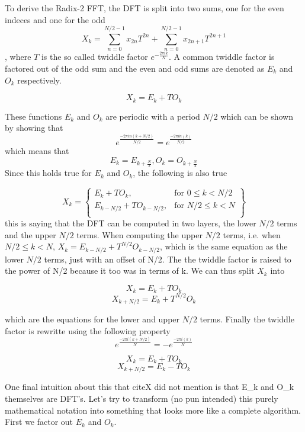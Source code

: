 To derive the Radix-2 FFT, the DFT is split into two sums, one for the even indeces and one for the odd $$X_k = \sum^{N/2-1}_{n=0} x_{2n}T^{2n}+ \sum^{N/2-1}_{n=0} x_{2n+1}T^{2n+1}$$, where $T$ is the so called twiddle factor $e^{-\frac{2\pi ik}{N}}$. A common twiddle factor is factored out of the odd sum and the even and odd sums are denoted as $E_k$ and $O_k$ respectively. 

$$X_k = E_k + TO_k$$

These functions $E_k$ and $O_k$ are periodic with a period $N/2$ which can be shown by showing that $$e^{\frac{-2\pi in(k+N/2)}{N/2}} = e^{\frac{-2\pi in(k)}{N/2}}$$
which means that 
$$E_k = E_{k+\frac{N}{2}}, O_k = O_{k+\frac{N}{2}}$$
Since this holds true for $E_k$ and $O_k$, the following is also true

\[
X_k = \left\{\begin{array}{lr}
    E_k + TO_k, & \text{for } 0 \leq k < N/2\\
    E_{k-N/2} + TO_{k-N/2}, & \text{for } N/2\leq k< N\\
    \end{array}\right\}
\]
this is saying that the DFT can be computed in two layers, the lower $N/2$ terms and the upper $N/2$ terms.
When computing the upper $N/2$ terms, i.e. when $N/2 \leq k < N$, $X_k = E_{k-N/2} + T^{N/2}O_{k-N/2}$, which is the same equation as the lower $N/2$ terms, just with an offset of N/2. The the twiddle factor is raised to the power of N/2 because it too was in terms of k. We can thus split $X_k$ into

$$X_k = E_k + TO_k$$  
$$X_{k+N/2} = E_k + T^{N/2}O_k$$

which are the equations for the lower and upper $N/2$ terms. Finally the twiddle factor is rewritte using the following property 
$$e^{\frac{-2\pi i(k+N/2)}{N}} = -e^{\frac{-2\pi i(k)}{N}}$$

$$X_k = E_k + TO_k$$  
$$X_{k+N/2} = E_k - TO_k$$

One final intuition about this that cite{X} did not mention is that E_k and O_k themselves are DFT's. Let's try to transform (no pun intended) this purely mathematical notation into something that looks more like a complete algorithm. First we factor out $E_k$ and $O_k$.






